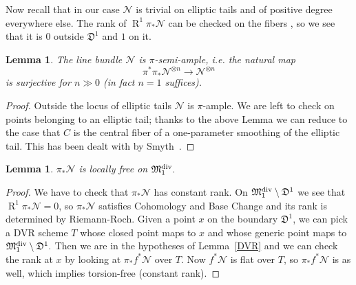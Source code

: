 \documentclass[11pt]{amsart}
\renewcommand{\to}{\rightarrow}
\newcommand{\MM}{\mathfrak M}
\newcommand{\R}{\operatorname{R}}
\theoremstyle{plain}
\newtheorem{lem}[thm]{Lemma}
\theoremstyle{definition}
\begin{document}
Now recall that in our case $\mathcal N$ is trivial on elliptic tails and of positive degree everywhere else. The rank of $\R^1\pi_*\mathcal N$ can be checked on the fibers \cite[Theorem III.12.11]{HAR}, so we see that it is $0$ outside $\mathfrak D^1$ and $1$ on it.

\begin{lem}\label{lemma:semiample}
The line bundle $\mathcal N$ is $\pi$-semi-ample, i.e. the natural map
\[\pi^*\pi_*\mathcal N^{\otimes n}\to \mathcal N^{\otimes n}\]
is surjective for $n\gg 0$ (in fact $n=1$ suffices).
\end{lem}
\begin{proof}
Outside the locus of elliptic tails $\mathcal N$ is $\pi$-ample. We are left to check on points belonging to an elliptic tail; thanks to the above Lemma we can reduce to the case that $C$ is the central fiber of a one-parameter smoothing of the elliptic tail. This has been dealt with by Smyth~\cite[Lemma~2.12]{SMY1}.
\end{proof}

\begin{lem}
$\pi_*\mathcal N$ is locally free on $\MM_1^{\rm{div}}.$
\end{lem}
\begin{proof}\cite[Proposition~3.7.2.1]{RSPW}
We have to check that $\pi_*\mathcal N$ has constant rank.
On $\MM_1^{\rm{div}}\setminus \mathfrak{D}^1$ we see that $\R^1\pi_*\mathcal N=0$, so $\pi_*\mathcal N$ satisfies Cohomology and Base Change and its rank is determined by Riemann-Roch.
Given a point $x$ on the boundary $\mathfrak{D}^1$, we can pick a DVR scheme $T$ whose closed point maps to $x$ and whose generic point maps to $\MM_1^{\rm{div}}\setminus \mathfrak{D}^1.$ Then we are in the hypotheses of Lemma~\ref{DVR} and we can check the rank at $x$ by looking at $\pi_*f^*\mathcal N$ over $T.$ Now $f^*\mathcal N$ is flat over $T$, so $\pi_*f^*\mathcal N$ is as well, which implies torsion-free (constant rank).
\end{proof}
\end{document}
